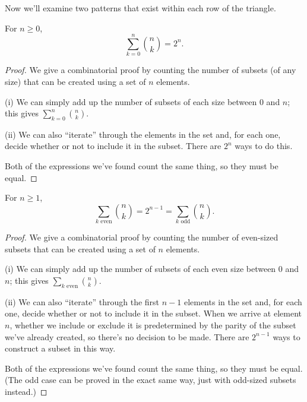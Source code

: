 \documentclass[../m055main.tex]{subfiles}
\begin{document}
Now we'll examine two patterns that exist within each row of the triangle.

\begin{theorem} \label{rowSums}
    For $n \geq 0$,
    \[ \sum_{k=0}^{n} {n \choose k} = 2^{n}. \]
\end{theorem}

\begin{proof}
    We give a combinatorial proof by counting the number of subsets (of any size) that can be created using a set of $n$ elements.
    \smallskip

    (i) We can simply add up the number of subsets of each size between 0 and $n$; this gives $\sum\limits_{k=0}^{n} {n \choose k}$.
    \vspace{-3pt}

    (ii) We can also ``iterate'' through the elements in the set and, for each one, decide whether or not to include it in the subset.
    There are $2^{n}$ ways to do this.
    \smallskip

    Both of the expressions we've found count the same thing, so they must be equal.
\end{proof}

\pagebreak

\begin{theorem} \label{parityRowSums}
    For $n \geq 1$,
    \[ \sum_{k\textrm{ even}} {n \choose k} = 2^{n-1} = \sum_{k\textrm{ odd}} {n \choose k}. \]
\end{theorem}

\begin{proof}
    We give a combinatorial proof by counting the number of even-sized subsets that can be created using a set of $n$ elements.
    \smallskip

    (i) We can simply add up the number of subsets of each even size between 0 and $n$; this gives $\sum\limits_{k\textrm{ even}} {n \choose k}$.
    \vspace{-10pt}

    (ii) We can also ``iterate'' through the first $n-1$ elements in the set and, for each one, decide whether or not to include it in the subset.
    When we arrive at element $n$, whether we include or exclude it is predetermined by the parity of the subset we've already created, so there's no decision to be made.
    There are $2^{n-1}$ ways to construct a subset in this way.
    \smallskip

    Both of the expressions we've found count the same thing, so they must be equal.
    (The odd case can be proved in the exact same way, just with odd-sized subsets instead.)
\end{proof}
\end{document}
